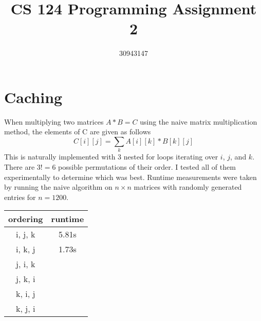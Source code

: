 \documentclass{article}
\begin{document}
\title{CS 124 Programming Assignment 2}
\author{30943147}
\maketitle
\section{Caching}
When multiplying two matrices $A*B=C$ using the naive matrix multiplication method, the elements of C are given as follows
$$C[i][j] = \sum\limits_k A[i][k]*B[k][j]$$
This is naturally implemented with 3 nested for loops iterating over $i$, $j$, and $k$. There are $3!=6$ possible permutations of their order. I tested all of them experimentally to determine which was best. Runtime measurements were taken by running the naive algorithm on $n \times n$ matrices with randomly generated entries for $n=1200$. 
\begin{center}
\begin{tabular}{ |c|c| } 
 \hline
 ordering & runtime\\ 
\hline
 i, j, k &  5.81s \\ 
\hline
 i, k, j & 1.73s \\ 
\hline
j, i, k & \\
\hline
j, k, i & \\
\hline
k, i, j & \\
k, j, i & \\
 \hline
\end{tabular}
\end{center}
\end{document}

